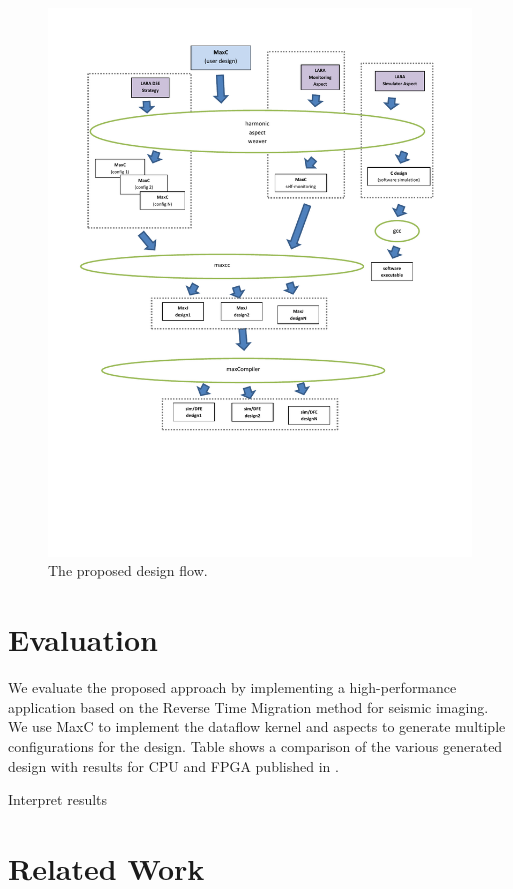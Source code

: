 \begin{figure}
\includegraphics[scale=0.5, trim=30 180 0 50]{lara_maxcc.pdf}
\caption{The proposed design flow.}
\label{fig:design-flow}
\end{figure}

\section{Evaluation}

We evaluate the proposed approach by implementing a high-performance
application based on the Reverse Time Migration method for seismic
imaging. We use MaxC to implement the dataflow kernel and aspects to
generate multiple configurations for the design. Table shows a
comparison of the various generated design with results for CPU and
FPGA published in \cite{Xinyu:Qiwei:Luk:Qiang:Pell:2012}.

\TODO Interpret results

\section{Related Work}


